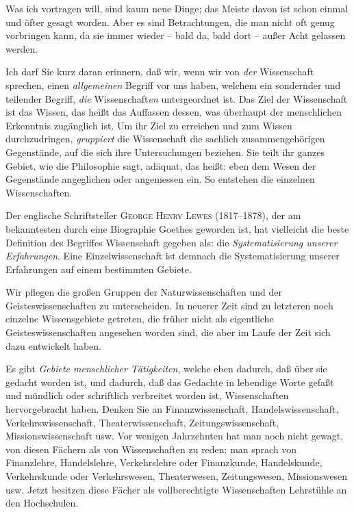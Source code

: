 \documentclass[a4paper,
fontsize=11pt,
oneside,
numbers=noperiodatend,
parskip=half-,
bibliography=totoc,
final
]{scrartcl}
\begin{document}
Was ich vortragen will, sind kaum neue Dinge; das Meiste davon ist schon
einmal und öfter gesagt worden. Aber es sind Betrachtungen, die man
nicht oft genug vorbringen kann, da sie immer wieder -- bald da, bald
dort -- außer Acht gelassen werden.

Ich darf Sie kurz daran erinnern, daß wir, wenn wir von \emph{der}
Wissenschaft sprechen, einen \emph{allgemeinen} Begriff vor uns haben,
welchem ein sondernder und teilender Begriff, \emph{die}
Wissenschaft\emph{en} untergeordnet ist. Das Ziel der Wissenschaft ist
das Wissen, das heißt das Auffassen dessen, was überhaupt der
menschlichen Erkenntnis zugänglich ist. Um ihr Ziel zu erreichen und zum
Wissen durchzudringen, \emph{gruppiert} die Wissenschaft die sachlich
zusammengehörigen Gegenstände, auf die sich ihre Untersuchungen
beziehen. Sie teilt ihr ganzes Gebiet, wie die Philosophie sagt,
adäquat, das heißt: eben dem Wesen der Gegenstände angeglichen oder
angemessen ein. So entstehen die einzelnen Wissenschaften.

Der englische Schriftsteller \textsc{George Henry Lewes} (1817--1878),
der am bekanntesten durch eine Biographie Goethes geworden ist, hat
vielleicht die beste Definition des Begriffes Wissenschaft gegeben als:
die \emph{Systematisierung unserer Erfahrungen}. Eine Einzelwissenschaft
ist demnach die Systematisierung unserer Erfahrungen auf einem
bestimmten Gebiete.

Wir pflegen die großen Gruppen der Naturwissenschaften und der
Geisteswissenschaften zu unterscheiden. In neuerer Zeit sind zu
letzteren noch einzelne Wissensgebiete getreten, die früher nicht als
eigentliche Geisteswissenschaften angesehen worden sind, die aber im
Laufe der Zeit sich dazu entwickelt haben.

Es gibt \emph{Gebiete menschlicher Tätigkeiten}, welche eben dadurch,
daß über sie gedacht worden ist, und dadurch, daß das Gedachte in
lebendige Worte gefaßt und mündlich oder schriftlich verbreitet worden
ist, Wissenschaften hervorgebracht haben. Denken Sie an
Finanzwissenschaft, Handelswissenschaft, Verkehrswissenschaft,
Theaterwissenschaft, Zeitungswissenschaft, Missionswissenschaft usw. Vor
wenigen Jahrzehnten hat man noch nicht gewagt, von diesen Fächern als
von Wissenschaften zu reden: man sprach von Finanzlehre, Handelslehre,
Verkehrslehre oder Finanzkunde, Handelskunde, Verkehrskunde oder
Verkehrswesen, Theaterwesen, Zeitungswesen, Missionswesen usw. Jetzt
besitzen diese Fächer als vollberechtigte Wissenschaften Lehrstühle an
den Hochschulen.
\end{document}
